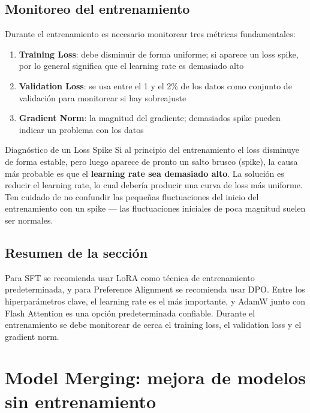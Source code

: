 \documentclass[a4paper]{article}
\begin{document}
\subsection{Monitoreo del entrenamiento}

Durante el entrenamiento es necesario monitorear tres métricas fundamentales:

\begin{enumerate}
    \item \textbf{Training Loss}: debe disminuir de forma uniforme; si aparece un loss spike, por lo general significa que el learning rate es demasiado alto
    \item \textbf{Validation Loss}: se usa entre el 1 y el 2\% de los datos como conjunto de validación para monitorear si hay sobreajuste
    \item \textbf{Gradient Norm}: la magnitud del gradiente; demasiados spike pueden indicar un problema con los datos
\end{enumerate}

\begin{warningbox}{Diagnóstico de un Loss Spike}
Si al principio del entrenamiento el loss disminuye de forma estable, pero luego aparece de pronto un salto brusco (spike), la causa más probable es que el \textbf{learning rate sea demasiado alto}. La solución es reducir el learning rate, lo cual debería producir una curva de loss más uniforme. Ten cuidado de no confundir las pequeñas fluctuaciones del inicio del entrenamiento con un spike — las fluctuaciones iniciales de poca magnitud suelen ser normales.
\end{warningbox}

\subsection{Resumen de la sección}

Para SFT se recomienda usar LoRA como técnica de entrenamiento predeterminada, y para Preference Alignment se recomienda usar DPO. Entre los hiperparámetros clave, el learning rate es el más importante, y AdamW junto con Flash Attention es una opción predeterminada confiable. Durante el entrenamiento se debe monitorear de cerca el training loss, el validation loss y el gradient norm.

\newpage
\section{Model Merging: mejora de modelos sin entrenamiento}
\end{document}

